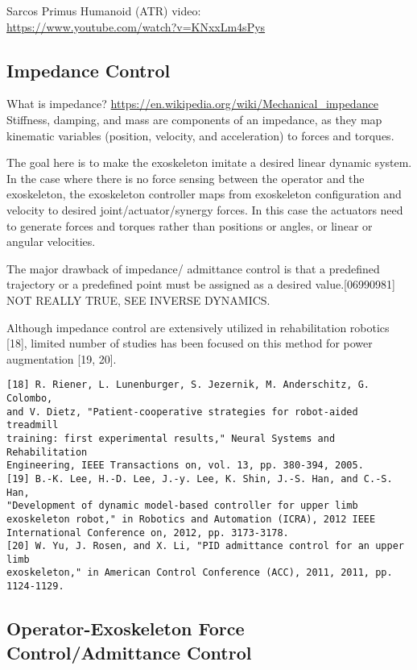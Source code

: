 \documentclass[letterpaper,12pt,fullpage]{article}
\begin{document}
Sarcos Primus Humanoid (ATR) video:\\
\url{https://www.youtube.com/watch?v=KNxxLm4sPys}

\subsection{Impedance Control}

What is impedance?
\url{https://en.wikipedia.org/wiki/Mechanical_impedance}
Stiffness, damping, and mass are components of an impedance, as
they map kinematic variables (position, velocity, and acceleration)
to forces and torques.

The goal here is to make the exoskeleton imitate a desired linear dynamic system.
In the case where there is no force sensing between the operator and the
exoskeleton, the exoskeleton controller maps from exoskeleton configuration
and velocity to desired joint/actuator/synergy forces.
In this case the actuators need to generate forces and torques rather than
positions or angles, or linear or angular velocities.

The major drawback of impedance/ admittance control
is that a predefined trajectory or a predefined point must be
assigned as a desired value.[06990981] NOT REALLY TRUE, SEE INVERSE DYNAMICS.

Although impedance control are extensively utilized in rehabilitation
robotics [18], limited number of studies has been focused on
this method for power augmentation [19, 20].
\begin{verbatim}
[18] R. Riener, L. Lunenburger, S. Jezernik, M. Anderschitz, G. Colombo,
and V. Dietz, "Patient-cooperative strategies for robot-aided treadmill
training: first experimental results," Neural Systems and Rehabilitation
Engineering, IEEE Transactions on, vol. 13, pp. 380-394, 2005.
[19] B.-K. Lee, H.-D. Lee, J.-y. Lee, K. Shin, J.-S. Han, and C.-S. Han,
"Development of dynamic model-based controller for upper limb
exoskeleton robot," in Robotics and Automation (ICRA), 2012 IEEE
International Conference on, 2012, pp. 3173-3178.
[20] W. Yu, J. Rosen, and X. Li, "PID admittance control for an upper limb
exoskeleton," in American Control Conference (ACC), 2011, 2011, pp.
1124-1129.
\end{verbatim}

\subsection{Operator-Exoskeleton Force Control/Admittance Control}
\end{document}
